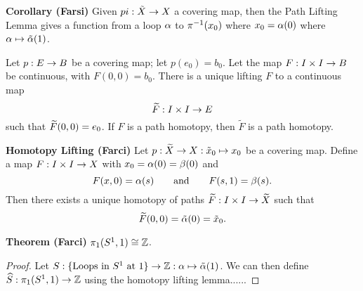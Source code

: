 \vs

\textbf{Corollary (Farsi)} Given $pi:\tilde X \rightarrow X$ a covering map, then the Path Lifting Lemma gives a function from a loop $\alpha$ to $\pi^{-1}(x_0)$ where $x_0 = \alpha(0)$ where $\alpha \mapsto \tilde {\alpha}(1)$.

\vs

\begin{lem}
Let $p: E \rightarrow B$ be a covering map; let $p(e_0) = b_0$. Let the map $F: I \times I \rightarrow B$ be continuous, with $F(0,0) = b_0$. There is a unique lifting $F$ to a continuous map
\[\widetilde F: I\times I \rightarrow E\]
such that $\widetilde F(0,0) = e_0$. If $F$ is a path homotopy, then $\tilde F$ is a path homotopy.
\end{lem}

\vs

\textbf{Homotopy Lifting (Farci)} Let $p: \widetilde X \rightarrow X:\tilde x_0 \mapsto x_0$ be a covering map. Define a map $F: I \times I \rightarrow X$ with $x_0 = \alpha(0) = \beta(0)$ and 
\[F(x, 0) = \alpha(s) \qquad\text{and}\qquad F(s, 1) = \beta(s).\]
Then there exists a unique homotopy of paths $\widetilde F: I\times I \rightarrow \widetilde X$ such that
\[\widetilde F(0,0) = \tilde{\alpha}(0) = \tilde x_0.\]



\vs 


\textbf{Theorem (Farci)} $\pi_1(S^1, 1) \cong \mathbb{Z}$.

\begin{proof}
Let $S: \{\text{Loops in $S^1$ at 1} \}\rightarrow \mathbb{Z}:\alpha \mapsto \tilde {\alpha}(1)$. We can then define $\widehat S: \pi_1 (S^1, 1) \rightarrow \mathbb{Z}$ using the homotopy lifting lemma......
\end{proof}













